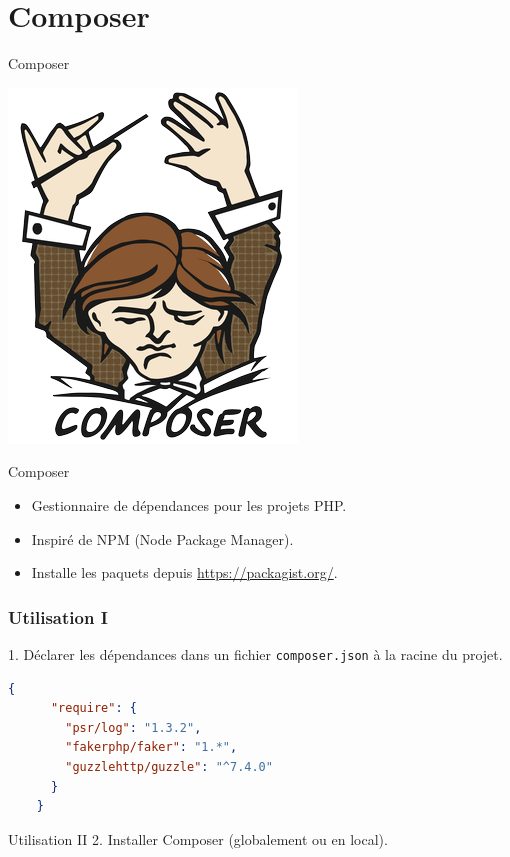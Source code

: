 \documentclass{beamer}
\begin{document}
\section{Composer}
\begin{frame}{Composer}
\begin{center}
  \includegraphics[scale=1.5]{images/composer.png}
\end{center}
\end{frame}

\begin{frame}{Composer}
\begin{itemize}
  \item Gestionnaire de dépendances pour les projets PHP.
  \item Inspiré de NPM (Node Package Manager).
  \item Installe les paquets depuis \url{https://packagist.org/}.
\end{itemize}
\end{frame}

\begin{frame}[fragile]
\frametitle{Utilisation I}
  1. Déclarer les dépendances dans un fichier \texttt{composer.json} à la racine du projet.
  \begin{lstlisting}[language=json]
    {
      "require": {
        "psr/log": "1.3.2",
        "fakerphp/faker": "1.*",
        "guzzlehttp/guzzle": "^7.4.0"
      }
    }
  \end{lstlisting}
\end{frame}

\begin{frame}{Utilisation II}
  2. Installer Composer (globalement ou en local).
\end{frame}
\end{document}
